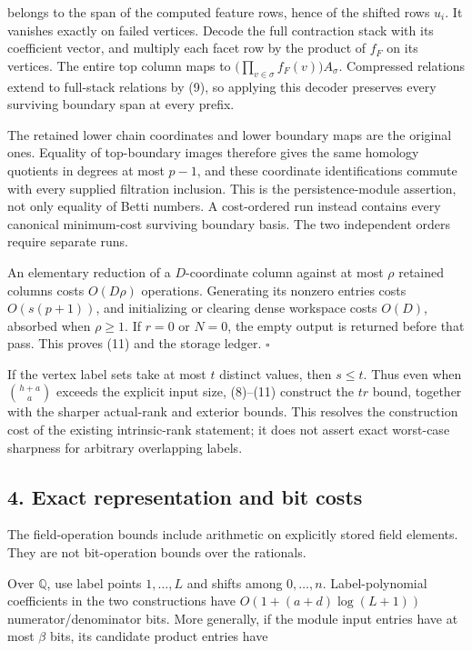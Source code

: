 belongs to the span of the computed feature rows, hence of the shifted rows \(u_i\). It vanishes exactly on failed vertices. Decode the full contraction stack with its coefficient vector, and multiply each facet row by the product of \(f_F\) on its vertices. The entire top column maps to \(\bigl(\prod_{v\in\sigma}f_F(v)\bigr)A_\sigma\). Compressed relations extend to full-stack relations by (9), so applying this decoder preserves every surviving boundary span at every prefix.

The retained lower chain coordinates and lower boundary maps are the original ones. Equality of top-boundary images therefore gives the same homology quotients in degrees at most \(p-1\), and these coordinate identifications commute with every supplied filtration inclusion. This is the persistence-module assertion, not only equality of Betti numbers. A cost-ordered run instead contains every canonical minimum-cost surviving boundary basis. The two independent orders require separate runs.

An elementary reduction of a \(D\)-coordinate column against at most \(\rho\) retained columns costs \(O(D\rho)\) operations. Generating its nonzero entries costs \(O(s(p+1))\), and initializing or clearing dense workspace costs \(O(D)\), absorbed when \(\rho\ge1\). If \(r=0\) or \(N=0\), the empty output is returned before that pass. This proves (11) and the storage ledger. \(\square\)

If the vertex label sets take at most \(t\) distinct values, then \(s\le t\). Thus even when \(\binom{h+a}{a}\) exceeds the explicit input size, (8)--(11) construct the \(tr\) bound, together with the sharper actual-rank and exterior bounds. This resolves the construction cost of the existing intrinsic-rank statement; it does not assert exact worst-case sharpness for arbitrary overlapping labels.

\hypertarget{af-4b125c3959-exact-representation-and-bit-costs}{%
\subsection{4. Exact representation and bit costs}\label{af-4b125c3959-exact-representation-and-bit-costs}}

The field-operation bounds include arithmetic on explicitly stored field elements. They are not bit-operation bounds over the rationals.

Over \(\mathbb Q\), use label points \(1,\ldots,L\) and shifts among \(0,\ldots,n\). Label-polynomial coefficients in the two constructions have \(O(1+(a+d)\log(L+1))\) numerator/denominator bits. More generally, if the module input entries have at most \(\beta\) bits, its candidate product entries have

